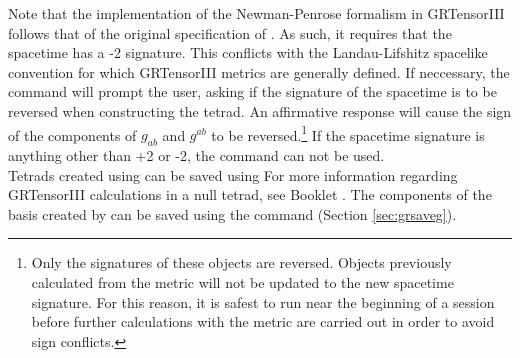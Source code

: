 \documentclass{article}
\begin{document}
Note that the implementation of the Newman-Penrose formalism in
GRTensorIII follows that of the original specification of
\cite{newman/penrose:1962}. As such, it requires that the spacetime
has a -2 signature. This conflicts with the Landau-Lifshitz spacelike
convention for which GRTensorIII metrics are generally defined. If
neccessary, the  command will prompt the user, asking
if the signature of the spacetime is to be reversed when constructing
the tetrad. An affirmative response will cause the sign of the
components of $g_{ab}$ and $g^{ab}$ to be reversed.\footnote{Only the
signatures of these objects are reversed. Objects previously calculated
from the metric will not be updated to the new spacetime
signature. For this reason, it is safest to run  near
the beginning of a session before further calculations with the metric
are carried out in order to avoid sign conflicts.} If the spacetime
signature is anything other than +2 or -2, the 
command can not be used.\\

Tetrads created using  can be saved using 
For more information regarding GRTensorIII calculations in a null
tetrad, see Booklet \grBasisRef.  The components of the basis created
by  can be saved using the  command
(Section \ref{sec:grsaveg}).
%
\end{document}
